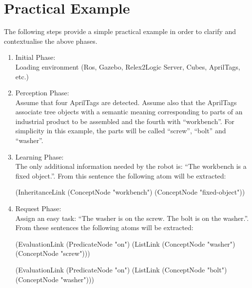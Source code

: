 \section{Practical Example}\label{sec:alg_example}

The following steps provide a simple practical example in order to clarify and contextualise the above phases.

\begin{enumerate}

	\item Initial Phase: \\
Loading environment (Ros, Gazebo, Relex2Logic Server, Cubes, AprilTags, etc.)

	\item Perception Phase: \\
Assume that four AprilTags are detected. Assume also that the AprilTags associate tree objects with a semantic meaning corresponding to parts of an industrial product to be assembled and the fourth with \enquote{workbench}. For simplicity in this example, the parts will be called \enquote{screw}, \enquote{bolt} and \enquote{washer}.

	\item Learning Phase: \\
The only additional information needed by the robot is: \enquote{The workbench is a fixed object.}. From this sentence the following atom will be extracted:
\begin{python}
	(InheritanceLink
		(ConceptNode "workbench")
		(ConceptNode "fixed-object"))
\end{python}

	\item Request Phase: \\
Assign an easy task: \enquote{The washer is on the screw. The bolt is on the washer.}.  From these sentences the following atoms will be extracted:
\begin{python}
	(EvaluationLink
		(PredicateNode "on")
		(ListLink
			(ConceptNode "washer")
			(ConceptNode "screw")))

	(EvaluationLink
		(PredicateNode "on")
		(ListLink
			(ConceptNode "bolt")
			(ConceptNode "washer")))
\end{python}


\end{enumerate}
